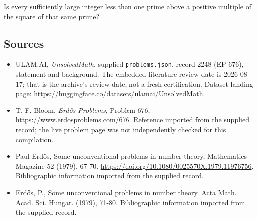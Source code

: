\documentclass[11pt,a4paper]{article}
\begin{document}
Is every sufficiently large integer less than one prime above a positive multiple of the square of that same prime?

\subsection{Sources}

{\small

\begin{itemize}

\item[\hypertarget{source:2248:1}{S1}] ULAM.AI, \emph{UnsolvedMath}, supplied \texttt{problems.json}, record 2248 (EP-676), statement and background. The embedded literature-review date is 2026-08-17; that is the archive’s review date, not a fresh certification. Dataset landing page: \url{https://huggingface.co/datasets/ulamai/UnsolvedMath}.

\item[\hypertarget{source:2248:2}{S2}] T. F. Bloom, \emph{Erdős Problems}, Problem 676, \url{https://www.erdosproblems.com/676}. Reference imported from the supplied record; the live problem page was not independently checked for this compilation.

\item[\hypertarget{source:2248:3}{S3}] Paul Erdős, Some unconventional problems in number theory, Mathematics Magazine 52 (1979), 67-70. \url{https://doi.org/10.1080/0025570X.1979.11976756}. Bibliographic information imported from the supplied record.

\item[\hypertarget{source:2248:4}{S4}] Erd\H{o}s, P., Some unconventional problems in number theory. Acta Math. Acad. Sci. Hungar. (1979), 71-80. Bibliographic information imported from the supplied record.

\end{itemize}

}

\label{end:2248}
\end{document}
